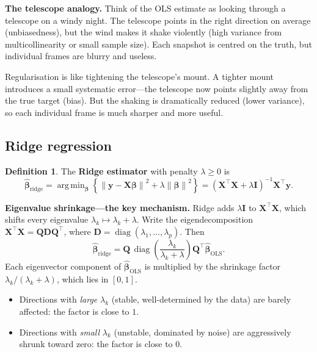 \documentclass[11pt,a4paper]{article}
\theoremstyle{plain}
\theoremstyle{definition}
\newtheorem{definition}[theorem]{Definition}
\newcommand{\bhat}{\hat{\bm{\beta}}}
\newcommand{\bX}{\bm{X}}
\newcommand{\by}{\bm{y}}
\newcommand{\bI}{\bm{I}}
\newcommand{\bQ}{\bm{Q}}
\newcommand{\bD}{\bm{D}}
\newcommand{\norm}[1]{\left\lVert #1 \right\rVert}
\DeclareMathOperator{\diag}{diag}
\DeclareMathOperator*{\argmin}{arg\,min}
\begin{document}
\noindent\textbf{The telescope analogy.}
Think of the OLS estimate as looking through a telescope on a windy night.
The telescope points in the right direction on average (unbiasedness),
but the wind makes it shake violently (high variance from
multicollinearity or small sample size).
Each snapshot is centred on the truth, but individual frames are blurry
and useless.

Regularisation is like tightening the telescope's mount.
A tighter mount introduces a small systematic error---the telescope
now points slightly away from the true target (bias).
But the shaking is dramatically reduced (lower variance), so each
individual frame is much sharper and more useful.


\subsection{Ridge regression}

\begin{definition}
The \textbf{Ridge estimator} with penalty $\lambda\ge 0$ is
\[
  \bhat_{\text{ridge}}
  = \argmin_{\bm{\beta}}\left\{
      \norm{\by-\bX\bm{\beta}}^2 + \lambda\norm{\bm{\beta}}^2
    \right\}
  = (\bX^\top\bX + \lambda\bI)^{-1}\bX^\top\by.
\]
\end{definition}

\noindent\textbf{Eigenvalue shrinkage---the key mechanism.}
Ridge adds $\lambda\bI$ to $\bX^\top\bX$, which shifts every eigenvalue
$\lambda_k\mapsto\lambda_k+\lambda$.
Write the eigendecomposition $\bX^\top\bX = \bQ\bD\bQ^\top$, where
$\bD = \diag(\lambda_1,\dots,\lambda_p)$.
Then
\begin{equation}\label{eq:ridge-eigen}
  \bhat_{\text{ridge}}
  = \bQ\,\diag\!\left(\frac{\lambda_k}{\lambda_k+\lambda}\right)\bQ^\top
    \bhat_{\text{OLS}}.
\end{equation}
Each eigenvector component of $\bhat_{\text{OLS}}$ is multiplied by the
shrinkage factor $\lambda_k/(\lambda_k+\lambda)$, which lies in $[0,1]$.
\begin{itemize}[nosep]
  \item Directions with \emph{large} $\lambda_k$ (stable, well-determined
        by the data) are barely affected: the factor is close to $1$.
  \item Directions with \emph{small} $\lambda_k$ (unstable, dominated by
        noise) are aggressively shrunk toward zero: the factor is close
        to $0$.
\end{itemize}
\end{document}

